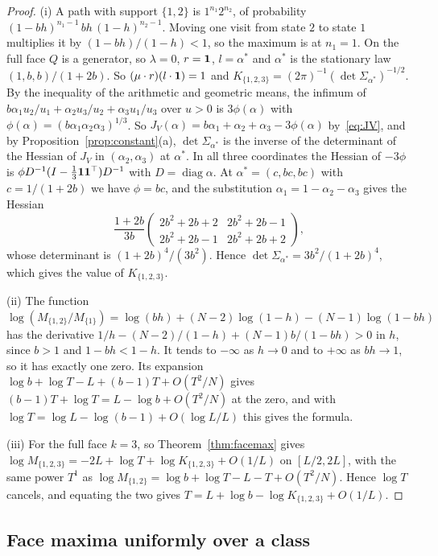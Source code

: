 \begin{proof}[Proof]
(i) A path with support $\{1,2\}$ is $1^{n_1}2^{n_2}$, of probability
$(1-bh)^{n_1-1}\,bh\,(1-h)^{n_2-1}$. Moving one visit from state $2$ to state $1$
multiplies it by $(1-bh)/(1-h)<1$, so the maximum is at $n_1=1$. On the full face $Q$
is a generator, so $\lambda=0$, $r=\mathbf{1}$, $l=\alpha^*$ and $\alpha^*$ is the stationary law
$(1,b,b)/(1+2b)$. So $(\mu\cdot r)(l\cdot\mathbf{1})=1$ and
$K_{\{1,2,3\}}=(2\pi)^{-1}(\det\Sigma_{\alpha^*})^{-1/2}$. By the inequality of the
arithmetic and geometric means, the infimum of
$b\alpha_1u_2/u_1+\alpha_2u_3/u_2+\alpha_3u_1/u_3$ over $u>0$ is $3\phi(\alpha)$ with
$\phi(\alpha)=(b\alpha_1\alpha_2\alpha_3)^{1/3}$. So
$J_V(\alpha)=b\alpha_1+\alpha_2+\alpha_3-3\phi(\alpha)$ by~\eqref{eq:JV}, and by
Proposition~\ref{prop:constant}(a), $\det\Sigma_{\alpha^*}$ is the inverse of the determinant
of the Hessian of $J_V$ in $(\alpha_2,\alpha_3)$ at $\alpha^*$. In all three coordinates the
Hessian of $-3\phi$ is $\phi D^{-1}(I-\frac13\mathbf{1}\mathbf{1}^\top)D^{-1}$ with
$D=\operatorname{diag}\alpha$. At $\alpha^*=(c,bc,bc)$ with $c=1/(1+2b)$ we have $\phi=bc$, and
the substitution $\alpha_1=1-\alpha_2-\alpha_3$ gives the Hessian
\[
\frac{1+2b}{3b}\begin{pmatrix}2b^2+2b+2&2b^2+2b-1\\2b^2+2b-1&2b^2+2b+2\end{pmatrix},
\]
whose determinant is $(1+2b)^4/(3b^2)$. Hence $\det\Sigma_{\alpha^*}=3b^2/(1+2b)^4$, which
gives the value of $K_{\{1,2,3\}}$.

(ii) The function $\log(M_{\{1,2\}}/M_{\{1\}})=\log(bh)+(N-2)\log(1-h)-(N-1)\log(1-bh)$
has the derivative $1/h-(N-2)/(1-h)+(N-1)b/(1-bh)>0$ in $h$, since $b>1$ and
$1-bh<1-h$. It tends to $-\infty$ as $h\to0$ and to $+\infty$ as $bh\to1$, so it has
exactly one zero. Its expansion $\log b+\log T-L+(b-1)T+O(T^2/N)$ gives
$(b-1)T+\log T=L-\log b+O(T^2/N)$ at the zero, and with $\log T=\log L-\log(b-1)+O(\log L/L)$
this gives the formula.

(iii) For the full face $k=3$, so Theorem~\ref{thm:facemax} gives
$\log M_{\{1,2,3\}}=-2L+\log T+\log K_{\{1,2,3\}}+O(1/L)$ on $[L/2,2L]$, with the same
power $T^1$ as $\log M_{\{1,2\}}=\log b+\log T-L-T+O(T^2/N)$. Hence $\log T$ cancels, and
equating the two gives $T=L+\log b-\log K_{\{1,2,3\}}+O(1/L)$.
\end{proof}


\subsection{Face maxima uniformly over a class}\label{sec:uniform-class}

